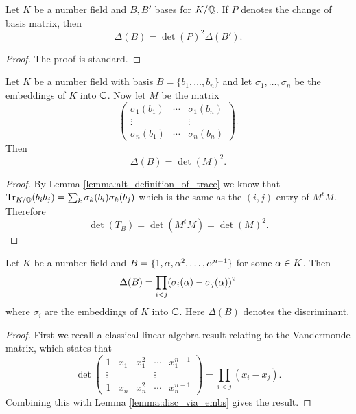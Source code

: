 \begin{lemma}\label{lem:disc_change_of_basis}
    \leanok
	Let $K$ be a number field and $B,B'$ bases for $K/\mathbb{Q}$. If $P$ denotes the change of basis matrix, then \[\Delta(B)=\det(P)^2 \Delta(B').\]
\end{lemma}
\begin{proof}
  \leanok
  The proof is standard.
\end{proof}

\begin{lemma}\label{lemma:disc_via_embs}
    \leanok
	Let $K$ be a number field with basis $B=\{b_1,\dots,b_n\}$ and let $\sigma_1,\dots,\sigma_n$ be the embeddings of $K$ into $\mathbb{C}$. Now let $M$ be the matrix  \[\left (\begin{matrix} \sigma_1(b_1) &\cdots& \sigma_1(b_n)\\ \vdots & & \vdots \\  \sigma_n(b_1) &\cdots& \sigma_n(b_n)
	\end{matrix} \right ).\] Then \[\Delta(B)=\det(M)^2.\]
\end{lemma}
\begin{proof}
    \leanok
	By Lemma \ref{lemma:alt_definition_of_trace} we know that  $\operatorname{Tr}_{K/\mathbb{Q}}(b_i b_j)= \sum_k \sigma_k(b_i)\sigma_k(b_j)$ which is the same as the $(i,j)$ entry of $M^t M$. Therefore \[\det(T_B)=\det(M^t M)=\det(M)^2.\]
\end{proof}

\begin{lemma}\label{lemma:disc_of_prim_elt_basis}
	\leanok
	Let $K$ be a number field and $B=\{1,\alpha,\alpha^2,\dots,\alpha^{n-1}\}$ for some $\alpha \in K$. Then \[\Delta(B)=\prod_{i < j} (\sigma_i(\alpha)-\sigma_j(\alpha))^2\] where $\sigma_i$ are the embeddings of $K $ into $\mathbb{C}$. Here $\Delta(B)$ denotes the discriminant.
\end{lemma}
\begin{proof}
    \leanok
	First we recall a classical linear algebra result relating to the Vandermonde matrix, which states that  \[\det \left (\begin{matrix} 1 & x_1& x_1^2&\cdots&x_1^{n-1} \\ \vdots & & & \vdots \\   1 & x_n& x_n^2&\cdots&x_n^{n-1}
	\end{matrix} \right ) =\prod_{i<j} (x_i-x_j).\] Combining this with Lemma \ref{lemma:disc_via_embs} gives the result.
\end{proof}


